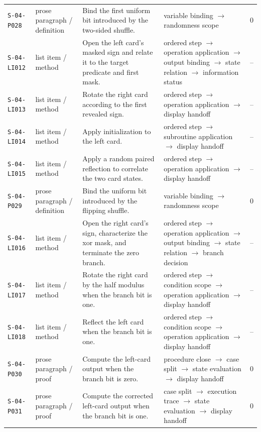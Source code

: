 \documentclass[10pt]{article}
\begin{document}
\begin{longtable}{@{}p{}p{}p{}p{}p{}@{}}
\texttt{S-04-P028}&prose paragraph / definition&Bind the first uniform bit introduced by the two-sided shuffle.&variable binding $\rightarrow$ randomness scope&0\\
\texttt{S-04-LI012}&list item / method&Open the left card's masked sign and relate it to the target predicate and first mask.&ordered step $\rightarrow$ operation application $\rightarrow$ output binding $\rightarrow$ state relation $\rightarrow$ information status&--\\
\texttt{S-04-LI013}&list item / method&Rotate the right card according to the first revealed sign.&ordered step $\rightarrow$ operation application $\rightarrow$ display handoff&--\\
\texttt{S-04-LI014}&list item / method&Apply initialization to the left card.&ordered step $\rightarrow$ subroutine application $\rightarrow$ display handoff&--\\
\texttt{S-04-LI015}&list item / method&Apply a random paired reflection to correlate the two card states.&ordered step $\rightarrow$ operation application $\rightarrow$ display handoff&--\\
\texttt{S-04-P029}&prose paragraph / definition&Bind the uniform bit introduced by the flipping shuffle.&variable binding $\rightarrow$ randomness scope&0\\
\texttt{S-04-LI016}&list item / method&Open the right card's sign, characterize the xor mask, and terminate the zero branch.&ordered step $\rightarrow$ operation application $\rightarrow$ output binding $\rightarrow$ state relation $\rightarrow$ branch decision&--\\
\texttt{S-04-LI017}&list item / method&Rotate the right card by the half modulus when the branch bit is one.&ordered step $\rightarrow$ condition scope $\rightarrow$ operation application $\rightarrow$ display handoff&--\\
\texttt{S-04-LI018}&list item / method&Reflect the left card when the branch bit is one.&ordered step $\rightarrow$ condition scope $\rightarrow$ operation application $\rightarrow$ display handoff&--\\
\texttt{S-04-P030}&prose paragraph / proof&Compute the left-card output when the branch bit is zero.&procedure close $\rightarrow$ case split $\rightarrow$ state evaluation $\rightarrow$ display handoff&0\\
\texttt{S-04-P031}&prose paragraph / proof&Compute the corrected left-card output when the branch bit is one.&case split $\rightarrow$ execution trace $\rightarrow$ state evaluation $\rightarrow$ display handoff&0\\

\end{longtable}
\end{document}
